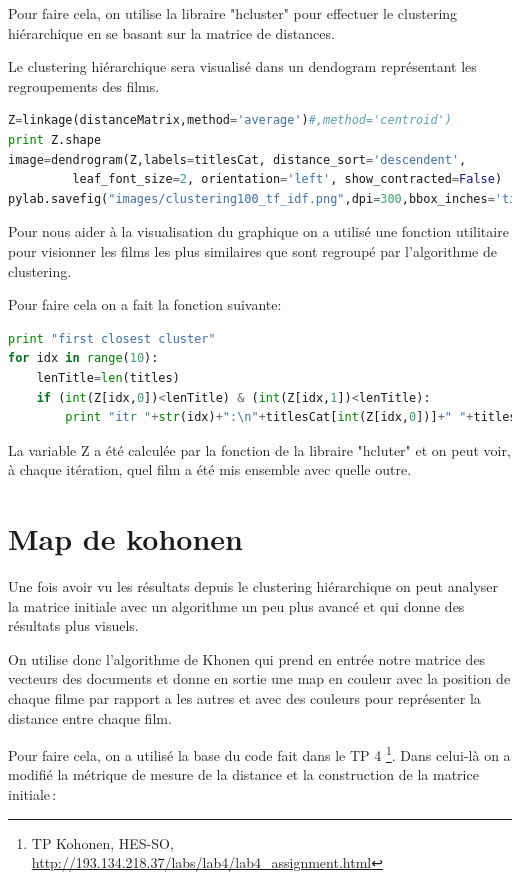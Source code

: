 	Pour faire cela, on utilise la libraire "hcluster" pour effectuer le clustering hiérarchique en se basant sur la matrice de distances.
	
	Le clustering hiérarchique sera visualisé dans un dendogram représentant les regroupements des films.
	\begin{lstlisting}[language=python]
Z=linkage(distanceMatrix,method='average')#,method='centroid')
print Z.shape
image=dendrogram(Z,labels=titlesCat, distance_sort='descendent',
         leaf_font_size=2, orientation='left', show_contracted=False)
pylab.savefig("images/clustering100_tf_idf.png",dpi=300,bbox_inches='tight')	 	  
	\end{lstlisting}
	
	Pour nous aider à la visualisation du graphique on a utilisé une fonction utilitaire pour visionner les films les plus similaires que sont regroupé par l'algorithme de clustering.
	
	Pour faire cela on a fait la fonction suivante:
		\begin{lstlisting}[language=python]
print "first closest cluster"
for idx in range(10):
    lenTitle=len(titles)
    if (int(Z[idx,0])<lenTitle) & (int(Z[idx,1])<lenTitle):
        print "itr "+str(idx)+":\n"+titlesCat[int(Z[idx,0])]+" "+titlesCat[int(Z[idx,1])]
		\end{lstlisting}
La variable Z a été calculée par la fonction de la libraire "hcluter" et on peut voir, à chaque itération, quel film a été mis ensemble avec quelle outre.	
	
	\section{Map de kohonen}
Une fois avoir vu les résultats depuis le clustering hiérarchique on peut analyser la matrice initiale avec un algorithme un peu plus avancé et qui donne des résultats plus visuels.

On utilise donc l'algorithme de Khonen qui prend en entrée notre matrice des vecteurs des documents et donne en sortie une map en couleur avec la position de chaque filme par rapport a les autres et avec des couleurs pour représenter la distance entre chaque film. 

Pour faire cela, on a utilisé la base du code fait dans le TP 4 \footnote{TP Kohonen, HES-SO, \url{http://193.134.218.37/labs/lab4/lab4_assignment.html}}. Dans celui-là  on a modifié la métrique de mesure de la distance et la construction de la matrice initiale :

